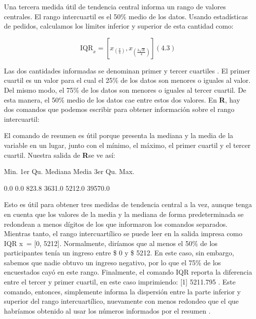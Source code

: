 \documentclass[
]{book}
\newenvironment{Shaded}{\begin{snugshade}}{\end{snugshade}}
\newcommand{\FunctionTok}[1]{\textcolor[rgb]{0.00,0.00,0.00}{#1}}
\newcommand{\NormalTok}[1]{#1}
\newcommand{\SpecialCharTok}[1]{\textcolor[rgb]{0.00,0.00,0.00}{#1}}
\begin{document}
Una tercera medida útil de tendencia central informa un rango de valores centrales. El rango intercuartil es el 50\% medio de los datos. Usando estadísticas de pedidos, calculamos los límites inferior y superior de esta cantidad como:

\[
\mathrm{IQR}_{x}=\left[x_{\left(\frac{\pi}{4}\right)}, x_{\left(\frac{3 \sqrt{R}}{4}\right)}\right]
(4.3)
\]

Las dos cantidades informadas se denominan primer y tercer cuartiles . El primer cuartil es un valor para el cual el 25\% de los datos son menores o iguales al valor. Del mismo modo, el 75\% de los datos son menores o iguales al tercer cuartil. De esta manera, el 50\% medio de los datos cae entre estos dos valores. En \textbf{R}, hay dos comandos que podemos escribir para obtener información sobre el rango intercuartil:

\begin{Shaded}
\end{Shaded}

El comando de resumen es útil porque presenta la mediana y la media de la variable en un lugar, junto con el mínimo, el máximo, el primer cuartil y el tercer cuartil. Nuestra salida de \textbf{R}se ve así:

Min. 1er Qu. Mediana Media 3er Qu. Max.

0.0 0.0 823.8 3631.0 5212.0 39570.0

Esto es útil para obtener tres medidas de tendencia central a la vez, aunque tenga en cuenta que los valores de la media y la mediana de forma predeterminada se redondean a menos dígitos de los que informaron los comandos separados. Mientras tanto, el rango intercuartílico se puede leer en la salida impresa como IQR x  = {[}0, 5212{]}. Normalmente, diríamos que al menos el 50\% de los participantes tenía un ingreso entre \$ 0 y \$ 5212. En este caso, sin embargo, sabemos que nadie obtuvo un ingreso negativo, por lo que el 75\% de los encuestados cayó en este rango. Finalmente, el comando IQR reporta la diferencia entre el tercer y primer cuartil, en este caso imprimiendo: {[}1{]} 5211.795 . Este comando, entonces, simplemente informa la dispersión entre la parte inferior y superior del rango intercuartílico, nuevamente con menos redondeo que el que habríamos obtenido al usar los números informados por el resumen .
\end{document}
